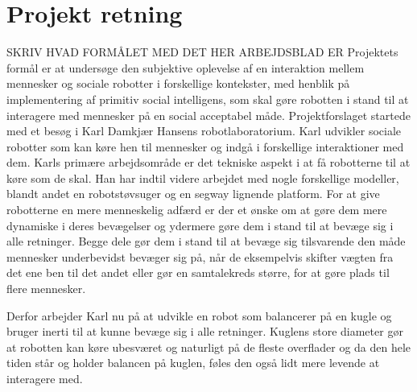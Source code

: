 \chapter{Projekt retning}
\label{ProjektRetning}
%
SKRIV HVAD FORMÅLET MED DET HER ARBEJDSBLAD ER\blankline
%
Projektets formål er at undersøge den subjektive oplevelse af en interaktion mellem mennesker og sociale robotter i forskellige kontekster, med henblik på implementering af primitiv social intelligens, som skal gøre robotten i stand til at interagere med mennesker på en social acceptabel måde.\blankline
%
Projektforslaget startede med et besøg i Karl Damkjær Hansens robotlaboratorium. Karl udvikler sociale robotter som kan køre hen til mennesker og indgå i forskellige interaktioner med dem. Karls primære arbejdsområde er det tekniske aspekt i at få robotterne til at køre som de skal. Han har indtil videre arbejdet med nogle forskellige modeller, blandt andet en robotstøvsuger og en segway lignende platform. For at give robotterne en mere menneskelig adfærd er der et ønske om at gøre dem mere dynamiske i deres bevægelser og ydermere gøre dem i stand til at bevæge sig i alle retninger. Begge dele gør dem i stand til at bevæge sig tilsvarende den måde mennesker underbevidst bevæger sig på, når de eksempelvis skifter vægten fra det ene ben til det andet eller gør en samtalekreds større, for at gøre plads til flere mennesker. 

Derfor arbejder Karl nu på at udvikle en robot som balancerer på en kugle og bruger inerti til at kunne bevæge sig i alle retninger. Kuglens store diameter gør at robotten kan køre ubesværet og naturligt på de fleste overflader og da den hele tiden står og holder balancen på kuglen, føles den også lidt mere levende at interagere med.
%
